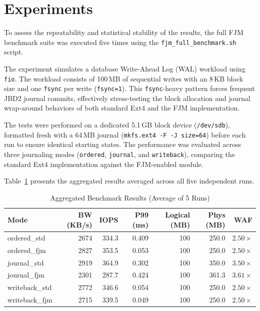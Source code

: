 \documentclass{article}
\begin{document}
\section{Experiments}

To assess the repeatability and statistical stability of the results, the full FJM benchmark suite was executed five times using the \texttt{fjm\_full\_benchmark.sh} script. 

The experiment simulates a database Write-Ahead Log (WAL) workload using \texttt{fio}. The workload consists of 100\,MB of sequential writes with an 8\,KB block size and one \texttt{fsync} per write (\texttt{fsync=1}). This \texttt{fsync}-heavy pattern forces frequent JBD2 journal commits, effectively stress-testing the block allocation and journal wrap-around behaviors of both standard Ext4 and the FJM implementation. 

The tests were performed on a dedicated 5.1\,GB block device (\texttt{/dev/sdb}), formatted fresh with a 64\,MB journal (\texttt{mkfs.ext4 -F -J size=64}) before each run to ensure identical starting states. The performance was evaluated across three journaling modes (\texttt{ordered}, \texttt{journal}, and \texttt{writeback}), comparing the standard Ext4 implementation against the FJM-enabled module.

Table~\ref{tab:aggregated} presents the aggregated results averaged across all five independent runs.

\begin{table}[h]
\centering
\caption{Aggregated Benchmark Results (Average of 5 Runs)}
\label{tab:aggregated}
\begin{tabular}{|l|r|r|r|r|r|r|}
\hline
\textbf{Mode} & \textbf{BW (KB/s)} & \textbf{IOPS} & \textbf{P99 (ms)} & \textbf{Logical (MB)} & \textbf{Phys (MB)} & \textbf{WAF} \\
\hline
ordered\_std  & 2674 & 334.3 & 0.409 & 100 & 250.0 & $2.50\times$ \\
ordered\_fjm  & 2827 & 353.5 & 0.053 & 100 & 250.0 & $2.50\times$ \\
journal\_std  & 2919 & 364.9 & 0.302 & 100 & 350.0 & $3.50\times$ \\
journal\_fjm  & 2301 & 287.7 & 0.424 & 100 & 361.3 & $3.61\times$ \\
writeback\_std & 2772 & 346.6 & 0.054 & 100 & 250.0 & $2.50\times$ \\
writeback\_fjm & 2715 & 339.5 & 0.049 & 100 & 250.0 & $2.50\times$ \\
\hline
\end{tabular}
\end{table}
\end{document}
